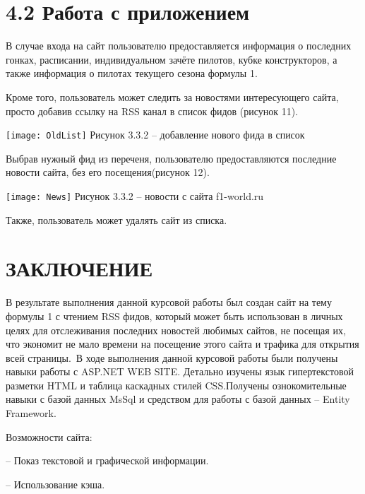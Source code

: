 \documentclass[14pt,a4paper]{extreport}
\begin{document}
 	\section*{\normalsize\hspace{4ex}4.2 Работа с приложением}
\flushleft\parindent=1cm В случае входа на сайт пользователю предоставляется информация о последних гонках, расписании, индивидуальном зачёте пилотов, кубке конструкторов, а также информация о пилотах текущего сезона формулы 1.\par
Кроме того, пользователь может следить за новостями интересующего сайта, просто добавив ссылку на RSS канал в список фидов (рисунок 11). \par
	\texttt{[image: OldList]}   
           \center Рисунок 3.3.2 – добавление нового фида в список\par
Выбрав нужный фид из переченя, пользователю предоставляются последние новости сайта, без его посещения(рисунок 12).\par
	\texttt{[image: News]}   
           \center Рисунок 3.3.2 –  новости с сайта f1-world.ru\par
Также, пользователь может удалять сайт из списка.\par
	\newpage
	\section*{\center\normalsize ЗАКЛЮЧЕНИЕ \endcenter}
	\hspace{4ex}В результате выполнения данной курсовой работы был создан сайт на тему формулы 1 с чтением RSS фидов, который может быть использован в личных целях для отслеживания последних новостей любимых сайтов, не посещая их, что экономит не мало времени на посещение этого сайта и трафика для открытия всей страницы.\
	\hspace{4ex}В ходе выполнения данной курсовой работы были получены навыки работы с ASP.NET WEB SITE. Детально изучены язык гипертекстовой разметки HTML и таблица каскадных стилей CSS.Получены ознокомительные навыки с базой данных MsSql и средством для работы с базой данных – Entity Framework.\

\hspace{4ex}Возможности сайта:\

\hspace{4ex}– Показ текстовой и графической информации.

\hspace{4ex}– Использование кэша.
\end{document}
